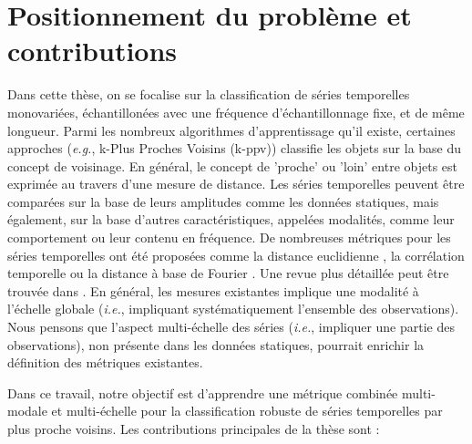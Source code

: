 \section*{Positionnement du problème et contributions}
Dans cette thèse, on se focalise sur la classification de séries temporelles monovariées, échantillonées avec une fréquence d'échantillonnage fixe, et de même longueur. Parmi les nombreux algorithmes d'apprentissage qu'il existe, certaines approches (\textit{e.g.}, k-Plus Proches Voisins (k-ppv)) classifie les objets sur la base du concept de voisinage. En général, le concept de 'proche' ou 'loin' entre objets est exprimée au travers d'une mesure de distance. Les séries temporelles peuvent être comparées sur la base de leurs amplitudes comme les données statiques, mais également, sur la base d'autres caractéristiques, appelées modalités, comme leur comportement ou leur contenu en fréquence. De nombreuses métriques pour les séries temporelles ont été proposées comme la distance euclidienne \cite{Ding2008}, la corrélation temporelle \cite{Frambourg2013a} ou la distance à base de Fourier \cite{Sahidullah2012a}. Une revue plus détaillée peut être trouvée dans \cite{Montero2014}. En général, les mesures existantes implique une modalité à l'échelle globale (\textit{i.e.}, impliquant systématiquement l'ensemble des observations). Nous pensons que l'aspect multi-échelle des séries (\textit{i.e.}, impliquer une partie des observations), non présente dans les données statiques, pourrait enrichir la définition des métriques existantes.

Dans ce travail, notre objectif est d'apprendre une métrique combinée multi-modale et multi-échelle pour la classification robuste de séries temporelles par plus proche voisins. Les contributions principales de la thèse sont :

